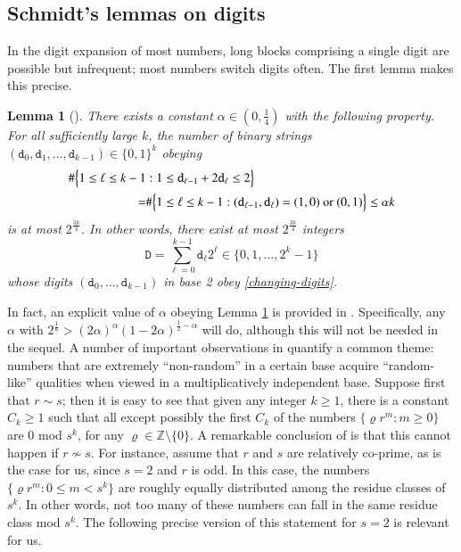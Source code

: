 \documentclass[12pt, twoside]{article}
\newtheorem{lemma}[theorem]{Lemma}
\theoremstyle{definition}
\numberwithin{equation}{section}
\begin{document}
\subsection{Schmidt's lemmas on digits}
In the digit expansion of most numbers, long blocks comprising a single digit are possible but infrequent; most numbers switch digits often. The first lemma makes this precise. 
\begin{lemma}[{\cite[Lemma 3]{s60}}] \label{digit-lemma-1}
There exists a constant $\alpha \in (0, \frac{1}{4})$ with the following property. For all sufficiently large $k$, the number of binary strings $(\mathtt d_0, \mathtt d_1, \ldots, \mathtt d_{k-1}) \in \{0, 1\}^k$ obeying 
\begin{align} \label{changing-digits} 
\# \Bigl\{1 \leq \ell \leq k-1 &: 1 \leq \mathtt d_{\ell-1} + 2 \mathtt d_{\ell} \leq 2 \Bigr\} \nonumber \\ = &\# \Bigl\{1 \leq \ell \leq k-1 : (\mathtt d_{\ell-1}, \mathtt d_{\ell}) = (1, 0) \text{ or } (0, 1) \Bigr\}  \leq \alpha k 
\end{align} 
is at most $2^{\frac{3k}{4}}$. In other words, there exist at most $2^{\frac{3k}{4}}$ integers 
\[ \mathtt D = \sum_{\ell=0}^{k-1} \mathtt d_{\ell} 2^{\ell} \in \{0, 1, \ldots, 2^{k}-1\} \] whose digits $(\mathtt d_0, \ldots, \mathtt d_{k-1})$ in base 2 obey \eqref{changing-digits}. 
\end{lemma}  
\noindent In fact, an explicit value of $\alpha$ obeying Lemma \ref{digit-lemma-1} is provided in \cite{s60}. Specifically, any $\alpha$ with $2^{\frac{1}{8}} > (2 \alpha)^{\alpha} (1 - 2 \alpha)^{\frac{1}{2} - \alpha}$ will do, although this will not be needed in the sequel.  
\vskip0.1in 
\noindent A number of important observations in \cite{s60} quantify a common theme: numbers that are extremely ``non-random'' in a certain base acquire ``random-like'' qualities when viewed in a multiplicatively independent base. Suppose first that $r \sim s$; then it is easy to see that given any integer $k \geq 1$, there is a constant $C_k \geq 1$ such that all except possibly the first $C_k$ of the numbers $\{\varrho r^m : m \geq 0 \}$ are 0 mod $s^k$, for any $\varrho \in \mathbb Z \setminus \{0\}$. A remarkable conclusion of \cite{s60} is that this cannot happen if $r \not\sim s$. For instance, assume that $r$ and $s$ are relatively co-prime, as is the case for us, since $s = 2$ and $r$ is odd. In this case, the numbers $\{\varrho r^m : 0 \leq m < s^k \}$ are roughly equally distributed among the residue classes of $s^k$. In other words, not too many of these numbers can fall in the same residue class mod $s^k$. The following precise version of this statement for $s = 2$ is relevant for us.  
\end{document}
